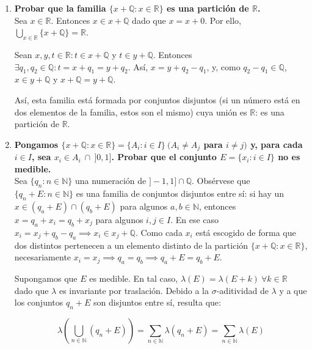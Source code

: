 
\begin{enumerate}[label=\alph*)]
	\item \textbf{Probar que la familia $\{x + \mathbb Q : x \in \mathbb R \}$ es una partición de $\mathbb R$.} \\
	
	Sea $x \in \mathbb R$. Entonces $x \in x+\mathbb Q$ dado que $x = x + 0$. Por ello, $\displaystyle \bigcup_{x \in \mathbb R} \{x+\mathbb Q\} = \mathbb R$.
	
	Sean $x,y,t \in \mathbb R : t \in x+\mathbb Q$ y $t \in y + \mathbb Q$. Entonces $\exists q_1, q_2 \in \mathbb Q : t = x + q_1 = y + q_2$. Así, $x = y + q_2 - q_1$, y, como $q_2 - q_1 \in \mathbb Q$, $x \in y + \mathbb Q$ y $x + \mathbb Q = y + \mathbb Q$.
	
	Así, esta familia está formada por conjuntos disjuntos (si un número está en dos elementos de la familia, estos son el mismo) cuya unión es $\mathbb R$: es una partición de $\mathbb R$.
	
	\item \textbf{Pongamos $\{x+\mathbb Q : x \in \mathbb R\} = \{A_i : i \in I\} \ (A_i \ne A_j$ para $i \ne j)$ y, para cada $i \in I$, sea $x_i \in A_i \ \cap \ ]0, 1]$. Probar que el conjunto $E = \{x_i : i \in I\}$ no es medible.} \\
	
	Sea $\{q_n : n \in \mathbb N\}$ una numeración de $]-1, 1] \cap \mathbb Q$. Obsérvese que $\{q_n + E : n \in \mathbb N\}$ es una familia de conjuntos disjuntos entre sí: si hay un $x \in (q_a + E) \cap (q_b + E)$ para algunos $a, b \in \mathbb N$, entonces $x = q_a + x_i = q_b + x_j$ para algunos $i,j \in I$. En ese caso $x_i = x_j + q_b - q_a \implies x_i \in x_j + \mathbb Q$. Como cada $x_i$ está escogido de forma que dos distintos pertenecen a un elemento distinto de la partición $\{x + \mathbb Q : x \in \mathbb R\}$, necesariamente $x_i = x_j \implies q_a = q_b \implies q_a + E = q_b + E$.
	
	Supongamos que $E$ es medible. En tal caso, $\lambda(E) = \lambda(E+k) \ \forall k \in \mathbb R$ dado que $\lambda$ es invariante por traslación. Debido a la $\sigma$-aditividad de $\lambda$ y a que los conjuntos $q_n + E$ son disjuntos entre sí, resulta que:
	
	$$\lambda(\bigcup_{n \in \mathbb N} (q_n + E)) = \sum_{n \in \mathbb N}\lambda(q_n + E) = \sum_{n \in \mathbb N} \lambda(E)$$
	

\end{enumerate}
